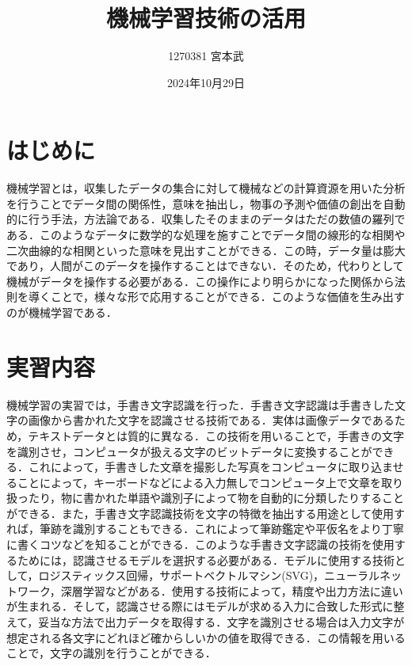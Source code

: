 \documentclass{jlreq}
\title{機械学習技術の活用}
\author{1270381 宮本武}
\date{2024年10月29日}
\begin{document}
\maketitle

\section{はじめに}
機械学習とは，収集したデータの集合に対して機械などの計算資源を用いた分析を行うことでデータ間の関係性，意味を抽出し，物事の予測や価値の創出を自動的に行う手法，方法論である．収集したそのままのデータはただの数値の羅列である．このようなデータに数学的な処理を施すことでデータ間の線形的な相関や二次曲線的な相関といった意味を見出すことができる．この時，データ量は膨大であり，人間がこのデータを操作することはできない．そのため，代わりとして機械がデータを操作する必要がある．この操作により明らかになった関係から法則を導くことで，様々な形で応用することができる．このような価値を生み出すのが機械学習である．

\section{実習内容}
機械学習の実習では，手書き文字認識を行った．手書き文字認識は手書きした文字の画像から書かれた文字を認識させる技術である．実体は画像データであるため，テキストデータとは質的に異なる．この技術を用いることで，手書きの文字を識別させ，コンピュータが扱える文字のビットデータに変換することができる．これによって，手書きした文章を撮影した写真をコンピュータに取り込ませることによって，キーボードなどによる入力無しでコンピュータ上で文章を取り扱ったり，物に書かれた単語や識別子によって物を自動的に分類したりすることができる．また，手書き文字認識技術を文字の特徴を抽出する用途として使用すれば，筆跡を識別することもできる．これによって筆跡鑑定や平仮名をより丁寧に書くコツなどを知ることができる．このような手書き文字認識の技術を使用するためには，認識させるモデルを選択する必要がある．モデルに使用する技術として，ロジスティックス回帰，サポートベクトルマシン(SVG)，ニューラルネットワーク，深層学習などがある．使用する技術によって，精度や出力方法に違いが生まれる．そして，認識させる際にはモデルが求める入力に合致した形式に整えて，妥当な方法で出力データを取得する．文字を識別させる場合は入力文字が想定される各文字にどれほど確からしいかの値を取得できる．この情報を用いることで，文字の識別を行うことができる．
\end{document}
